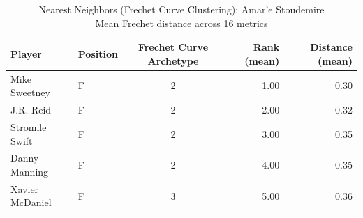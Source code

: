 \begin{table}[t]
\caption*{
{\fontsize{20}{25} Nearest Neighbors (Frechet Curve Clustering): Amar'e Stoudemire\fontsize{12}{15}\selectfont } \\ 
{\fontsize{14}{17}\selectfont  Mean Frechet distance across 16 metrics\fontsize{12}{15}\selectfont }
} 
\fontsize{12.0pt}{14.0pt}\selectfont
\begin{tabular*}{\linewidth}{@{\extracolsep{\fill}}llcrr}
\toprule
Player & Position & Frechet Curve Archetype & Rank (mean) & Distance (mean) \\ 
\midrule\addlinespace[2.5pt]
Mike Sweetney & F & 2 & 1.00 & 0.30 \\ 
J.R. Reid & F & 2 & 2.00 & 0.32 \\ 
Stromile Swift & F & 2 & 3.00 & 0.35 \\ 
Danny Manning & F & 2 & 4.00 & 0.35 \\ 
Xavier McDaniel & F & 3 & 5.00 & 0.36 \\ 
\bottomrule
\end{tabular*}
\end{table}

